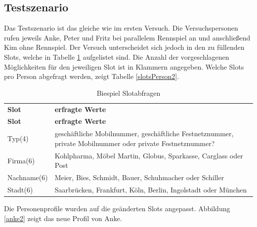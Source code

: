 \documentclass[12pt,a4paper]{scrartcl}
\begin{document}
\subsection{Testszenario}
Das Testszenario ist das gleiche wie im ersten Versuch. Die Versuchspersonen rufen jeweils Anke, Peter und Fritz bei parallelem Rennspiel an und anschließend Kim ohne Rennspiel. Der Versuch unterscheidet sich jedoch in den zu füllenden Slots, welche in Tabelle \ref{slots2} aufgelistet sind. Die Anzahl der vorgeschlagenen Möglichkeiten für den jeweiligen Slot ist in Klammern angegeben.
Welche Slots pro Person abgefragt werden, zeigt Tabelle \ref{slotsPerson2}. 
\begin{longtable}{p{4cm}p{10cm}}
	\label{slots2}\\
	\caption[Slotabfragen]{Biespiel Slotabfragen}\\
	\hline
	\textbf{Slot} &\textbf{erfragte Werte}\\
	\hline
	\endfirsthead
	\hline
	\textbf{Slot} &	\textbf{erfragte Werte}\\
	\hline
	\endhead
Typ(4) & geschäftliche Mobilnummer, geschäftliche Festnetznummer, private Mobilnummer oder private Festnetznummer?\\
Firma(6) & Kohlpharma, Möbel Martin, Globus, Sparkasse, Carglass oder Post\\
Nachname(6) & Meier, Bies, Schmidt, Bauer, Schuhmacher oder Schiller \\
Stadt(6) & Saarbrücken, Frankfurt, Köln, Berlin, Ingolstadt oder München\\
\hline
\end{longtable}

Die Personenprofile wurden auf die geänderten Slots angepasst. Abbildung \ref{anke2} zeigt das neue Profil von Anke. 
\end{document}
